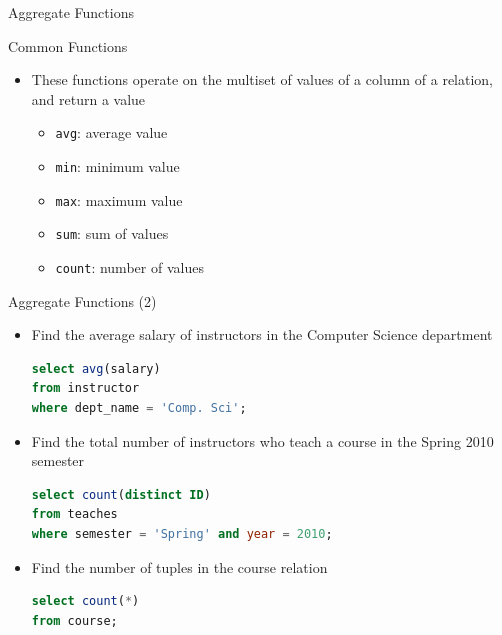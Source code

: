 \documentclass[aspectratio=169, xcolor=dvipsnames]{beamer}
\begin{document}
\begin{frame}{Aggregate Functions}
    \begin{exampleblock}{Common Functions}
        \begin{itemize}[<+->]
            \item These functions operate on the multiset of values of a column of a relation, and return a value
            \begin{itemize}
                \item[$\triangleright$] \texttt{avg}: average value
                \item[$\triangleright$] \texttt{min}: minimum value
                \item[$\triangleright$] \texttt{max}: maximum value
                \item[$\triangleright$] \texttt{sum}: sum of values
                \item[$\triangleright$] \texttt{count}: number of values
            \end{itemize}
        \end{itemize}
    \end{exampleblock}
\end{frame}

\begin{frame}[fragile]{Aggregate Functions (2)}
    \begin{itemize}
        \item Find the average salary of instructors in the Computer Science department
        \begin{lstlisting}[language=SQL]
select avg(salary) 
from instructor 
where dept_name = 'Comp. Sci';
        \end{lstlisting}
        \item Find the total number of instructors who teach a course in the Spring 2010 semester
        \begin{lstlisting}[language=SQL]
select count(distinct ID) 
from teaches 
where semester = 'Spring' and year = 2010;
        \end{lstlisting}
        \item Find the number of tuples in the course relation
        \begin{lstlisting}[language=SQL]
select count(*) 
from course;
        \end{lstlisting}
    \end{itemize}
\end{frame}
\end{document}
